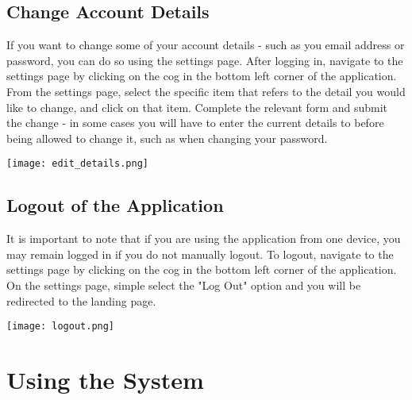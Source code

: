 \documentclass[12pt]{article}
\begin{document}
\subsection{Change Account Details}
If you want to change some of your account details - such as you email address or password, you can do so using the settings page. After logging in, navigate to the settings page by clicking on the cog in the bottom left corner of the application. From the settings page, select the specific item that refers to the detail you would like to change, and click on that item. Complete the relevant form and submit the change - in some cases you will have to enter the current details to before being allowed to change it, such as when changing your password.
\begin{center}
\texttt{[image: edit\_details.png]}
\end{center}

\subsection{Logout of the Application}
It is important to note that if you are using the application from one device, you may remain logged in if you do not manually logout. To logout, navigate to the settings page by clicking on the cog in the bottom left corner of the application. On the settings page, simple select the "Log Out" option and you will be redirected to the landing page.
\begin{center}
\texttt{[image: logout.png]}
\end{center}

\section{Using the System}
\end{document}
